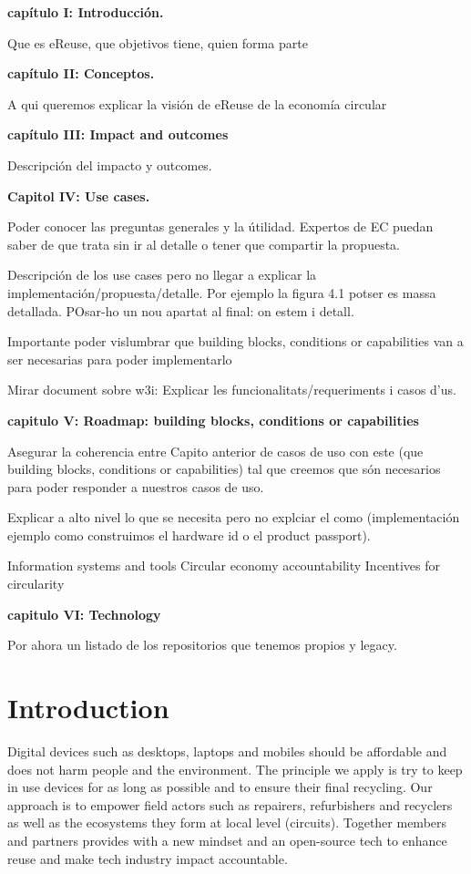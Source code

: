 \documentclass[
]{book}
\begin{document}
\textbf{capítulo I: Introducción.}

Que es eReuse, que objetivos tiene, quien forma parte

\textbf{capítulo II: Conceptos.}

A qui queremos explicar la visión de eReuse de la economía circular

\textbf{capítulo III: Impact and outcomes}

Descripción del impacto y outcomes.

\textbf{Capitol IV: Use cases.}

Poder conocer las preguntas generales y la útilidad. Expertos de EC puedan saber de que trata sin ir al detalle o tener que compartir la propuesta.

Descripción de los use cases pero no llegar a explicar la implementación/propuesta/detalle. Por ejemplo la figura 4.1 potser es massa detallada. POsar-ho un nou apartat al final: on estem i detall.

Importante poder vislumbrar que building blocks, conditions or capabilities van a ser necesarias para poder implementarlo

Mirar document sobre w3i: Explicar les funcionalitats/requeriments i casos d'us.

\textbf{capitulo V: Roadmap: building blocks, conditions or capabilities}

Asegurar la coherencia entre Capito anterior de casos de uso con este (que building blocks, conditions or capabilities) tal que creemos que són necesarios para poder responder a nuestros casos de uso.

Explicar a alto nivel lo que se necesita pero no explciar el como (implementación ejemplo como construimos el hardware id o el product passport).

Information systems and tools
Circular economy accountability
Incentives for circularity

\textbf{capitulo VI: Technology}

Por ahora un listado de los repositorios que tenemos propios y legacy.

\hypertarget{introduction}{%
\chapter{Introduction}\label{introduction}}

Digital devices such as desktops, laptops and mobiles should be affordable and does not harm people and the environment. The principle we apply is try to keep in use devices for as long as possible and to ensure their final recycling. Our approach is to empower field actors such as repairers, refurbishers and recyclers as well as the ecosystems they form at local level (circuits). Together members and partners provides with a new mindset and an open-source tech to enhance reuse and make tech industry impact accountable.
\end{document}
